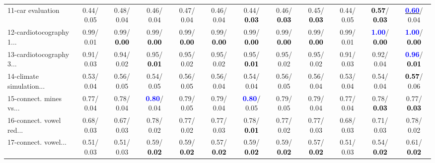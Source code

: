 \begin{table}[h]
\begin{center}
{\begin{tabular}{lc|c|c|c|c|c|c|c|c|c|c}
11-car evaluation &   0.44/  0.05 &   0.48/  0.04 &   0.46/  0.04 &   0.47/  0.04 &   0.46/  0.04 &   0.44/\textcolor{black}{\textbf{  0.03}} &   0.46/\textcolor{black}{\textbf{  0.03}} &   0.45/\textcolor{black}{\textbf{  0.03}} &   0.44/  0.05 & \textcolor{black}{\textbf{  0.57}}/\textcolor{black}{\textbf{  0.03}} & \underline{\textcolor{blue}{\textbf{  0.60}}}/  0.04 \\
12-cardiotocography 1... &   0.99/  0.01 &   0.99/\textcolor{black}{\textbf{  0.00}} &   0.99/\textcolor{black}{\textbf{  0.00}} &   0.99/\textcolor{black}{\textbf{  0.00}} &   0.99/\textcolor{black}{\textbf{  0.00}} &   0.99/\textcolor{black}{\textbf{  0.00}} &   0.99/\textcolor{black}{\textbf{  0.00}} &   0.99/\textcolor{black}{\textbf{  0.00}} &   0.99/  0.01 & \textcolor{blue}{\textbf{  1.00}}/\textcolor{black}{\textbf{  0.00}} & \textcolor{blue}{\textbf{  1.00}}/\textcolor{black}{\textbf{  0.00}} \\
13-cardiotocography 3... &   0.91/  0.03 &   0.94/  0.02 &   0.95/\textcolor{black}{\textbf{  0.01}} &   0.95/  0.02 &   0.95/  0.02 &   0.95/\textcolor{black}{\textbf{  0.01}} &   0.95/  0.02 &   0.95/  0.02 &   0.91/  0.03 &   0.92/  0.04 & \textcolor{blue}{\textbf{  0.96}}/\textcolor{black}{\textbf{  0.01}} \\
14-climate simulation... &   0.53/  0.04 &   0.56/  0.05 &   0.54/  0.05 &   0.56/  0.05 &   0.56/  0.04 &   0.54/  0.04 &   0.56/  0.05 &   0.56/  0.04 &   0.53/  0.04 &   0.54/  0.04 & \textcolor{black}{\textbf{  0.57}}/  0.06 \\ \hline
15-connect. mines vs... &   0.77/  0.04 &   0.78/  0.04 & \textcolor{blue}{\textbf{  0.80}}/  0.04 &   0.79/  0.05 &   0.79/  0.04 & \textcolor{blue}{\textbf{  0.80}}/  0.05 &   0.79/  0.05 &   0.79/  0.04 &   0.77/  0.04 &   0.78/\textcolor{black}{\textbf{  0.03}} &   0.77/\textcolor{black}{\textbf{  0.03}} \\
16-connect. vowel red... &   0.68/  0.03 &   0.67/  0.03 &   0.78/  0.02 &   0.77/  0.02 &   0.77/  0.03 &   0.78/\textcolor{black}{\textbf{  0.01}} &   0.77/  0.02 &   0.77/  0.03 &   0.68/  0.03 &   0.71/  0.03 &   0.78/  0.02 \\
17-connect. vowel... &   0.51/  0.03 &   0.51/  0.03 &   0.59/\textcolor{black}{\textbf{  0.02}} &   0.59/\textcolor{black}{\textbf{  0.02}} &   0.57/\textcolor{black}{\textbf{  0.02}} &   0.59/\textcolor{black}{\textbf{  0.02}} &   0.59/\textcolor{black}{\textbf{  0.02}} &   0.57/\textcolor{black}{\textbf{  0.02}} &   0.51/  0.03 &   0.54/\textcolor{black}{\textbf{  0.02}} &   0.61/\textcolor{black}{\textbf{  0.02}} \\

\end{tabular}}
\end{center}
\end{table}
